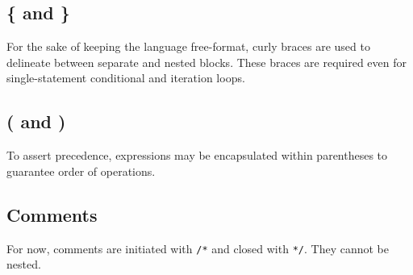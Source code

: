		\subsection{\{ and \}}
			For the sake of keeping the language free-format, curly braces are used to delineate between separate and nested blocks. These braces are required even for single-statement conditional and iteration loops. 
		\subsection{( and )}
			To assert precedence, expressions may be encapsulated within parentheses to guarantee order of operations. 
		\subsection{Comments}
			For now, comments are initiated with \texttt{/*} and closed with \texttt{*/}. They cannot be nested.

			
			
			
